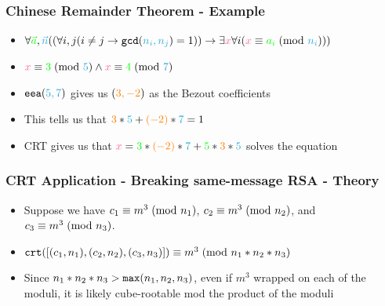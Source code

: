 \documentclass[aspectratio=169]{beamer}
\begin{document}
\begin{frame}[fragile]
\frametitle{Chinese Remainder Theorem - Example}
\begin{itemize}
\item $\forall {\color{green}\vec{a}}, {\color{cybercyan}\vec{n}}((\forall i,j(i \neq j \rightarrow \verb|gcd|({\color{cybercyan}n_i, n_j}) = 1)) \rightarrow \exists {\color{cyberpink}x} \forall i({\color{cyberpink}x} \equiv {\color{green}a_i}\hspace{1mm}(\text{mod }{\color{cybercyan}n_i})))$
\item ${\color{cyberpink}x} \equiv {\color{green}3} \hspace{1mm}(\text{mod } {\color{cybercyan}5}) \land {\color{cyberpink}x} \equiv {\color{green}4} \hspace{1mm}(\text{mod } {\color{cybercyan}7})$
\item $\verb|eea|({\color{cybercyan}5,7})$ gives us $({\color{orange}3, -2})$ as the Bezout coefficients
\item This tells us that ${\color{orange}3}*{\color{cybercyan}5} + {\color{orange}(-2)}*{\color{cybercyan}7} = 1$
\item CRT gives us that ${\color{cyberpink}x} = {\color{green}3} * {\color{orange}(-2)} * {\color{cybercyan}7} + {\color{green}5} * {\color{orange}3} * {\color{cybercyan}5}$ solves the equation
\end{itemize}
\end{frame}

\begin{frame}[fragile]
\frametitle{CRT Application - Breaking same-message RSA - Theory}
\begin{itemize}
\item Suppose we have
$c_1 \equiv m^3\hspace{1mm}(\text{mod }n_1)$,
$c_2 \equiv m^3\hspace{1mm}(\text{mod }n_2)$, and
$c_3 \equiv m^3\hspace{1mm}(\text{mod }n_3)$.
\item $\verb|crt|([(c_1, n_1), (c_2, n_2), (c_3, n_3)]) \equiv m^3\hspace{1mm}(\text{mod }n_1*n_2*n_3)$
\item Since $n_1*n_2*n_3 > \verb|max|(n_1, n_2, n_3)$, even if $m^3$ wrapped on each of the moduli, it is likely cube-rootable mod the product of the moduli
\end{itemize}
\end{frame}

\end{document}
